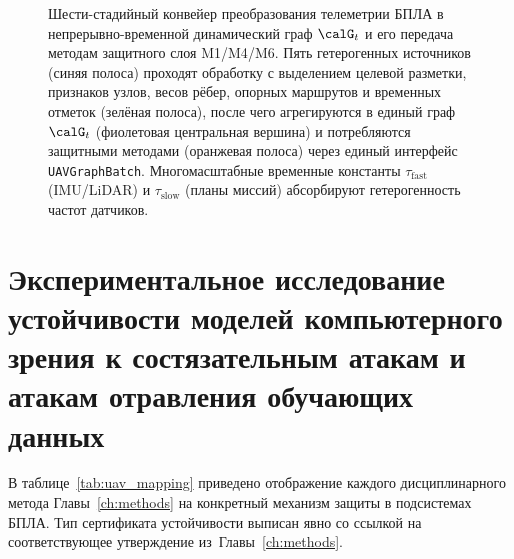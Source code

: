 \begin{figure}[htbp]
\caption{Шести-стадийный конвейер преобразования телеметрии БПЛА в
непрерывно-временной динамический граф $\calG_t$ и его передача
методам защитного слоя \textsf{M1}/\textsf{M4}/\textsf{M6}. Пять
гетерогенных источников (синяя полоса) проходят обработку с
выделением целевой разметки, признаков узлов, весов рёбер, опорных
маршрутов и временных отметок (зелёная полоса), после чего
агрегируются в единый граф $\calG_t$ (фиолетовая центральная
вершина) и потребляются защитными методами (оранжевая полоса)
через единый интерфейс \texttt{UAVGraphBatch}.
Многомасштабные временные константы $\tau_{\mathrm{fast}}$
(IMU/LiDAR) и $\tau_{\mathrm{slow}}$ (планы миссий) абсорбируют
гетерогенность частот датчиков.}
\label{fig:uav_telemetry_pipeline}
\end{figure}


\section{Экспериментальное исследование устойчивости моделей компьютерного зрения к состязательным атакам и атакам отравления обучающих данных}
\label{sec:uav_mapping}

В таблице~\ref{tab:uav_mapping} приведено отображение каждого
дисциплинарного метода Главы~\ref{ch:methods} на конкретный механизм
защиты в подсистемах БПЛА. Тип сертификата устойчивости выписан явно
со ссылкой на соответствующее утверждение из~Главы~\ref{ch:methods}.

